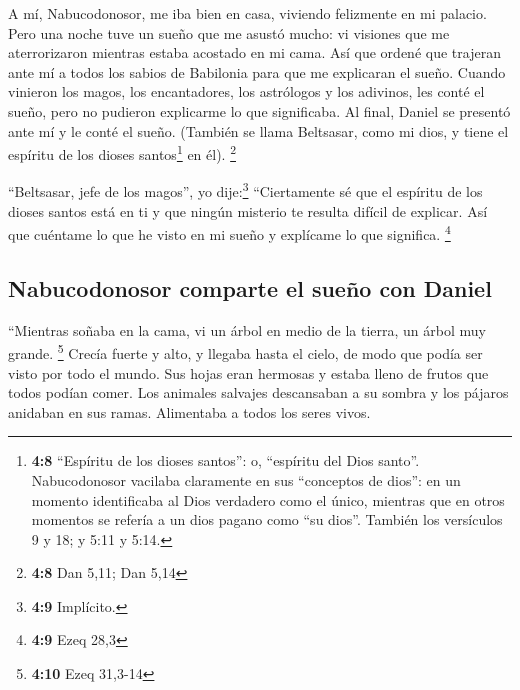  A mí, Nabucodonosor, me iba bien en casa, viviendo
felizmente en mi palacio.  Pero una noche tuve un sueño
que me asustó mucho: vi visiones que me aterrorizaron mientras estaba
acostado en mi cama.  Así que ordené que trajeran ante mí
a todos los sabios de Babilonia para que me explicaran el sueño.
 Cuando vinieron los magos, los encantadores, los
astrólogos y los adivinos, les conté el sueño, pero no pudieron
explicarme lo que significaba.  Al final, Daniel se
presentó ante mí y le conté el sueño. (También se llama Beltsasar, como
mi dios, y tiene el espíritu de los dioses santos\footnote{\textbf{4:8}
  ``Espíritu de los dioses santos'': o, ``espíritu del Dios santo''.
  Nabucodonosor vacilaba claramente en sus ``conceptos de dios'': en un
  momento identificaba al Dios verdadero como el único, mientras que en
  otros momentos se refería a un dios pagano como ``su dios''. También
  los versículos 9 y 18; y 5:11 y 5:14.} en él). \footnote{\textbf{4:8}
  Dan 5,11; Dan 5,14}

 ``Beltsasar, jefe de los magos'', yo dije:\footnote{\textbf{4:9}
  Implícito.} ``Ciertamente sé que el espíritu de los dioses santos está
en ti y que ningún misterio te resulta difícil de explicar. Así que
cuéntame lo que he visto en mi sueño y explícame lo que significa.
\footnote{\textbf{4:9} Ezeq 28,3}

\hypertarget{nabucodonosor-comparte-el-sueuxf1o-con-daniel}{%
\subsection{Nabucodonosor comparte el sueño con
Daniel}\label{nabucodonosor-comparte-el-sueuxf1o-con-daniel}}

 ``Mientras soñaba en la cama, vi un árbol en medio de la
tierra, un árbol muy grande. \footnote{\textbf{4:10} Ezeq 31,3-14}
 Crecía fuerte y alto, y llegaba hasta el cielo, de modo
que podía ser visto por todo el mundo.  Sus hojas eran
hermosas y estaba lleno de frutos que todos podían comer. Los animales
salvajes descansaban a su sombra y los pájaros anidaban en sus ramas.
Alimentaba a todos los seres vivos.

